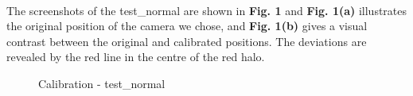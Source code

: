 \documentclass[a4paper]{article}
\begin{document}
~\\
The screenshots of the test\_normal are shown in \textbf{Fig. 1} and 
\textbf{Fig. 1(a)} illustrates the original position of the camera we chose, and \textbf{Fig. 1(b)} gives a visual contrast between the original and calibrated positions. The deviations are revealed by the red line in the centre of the red halo.

\begin{figure}[htbp]
\centering
{}
\caption{Calibration - test\_normal}
\end{figure}
\end{document}
